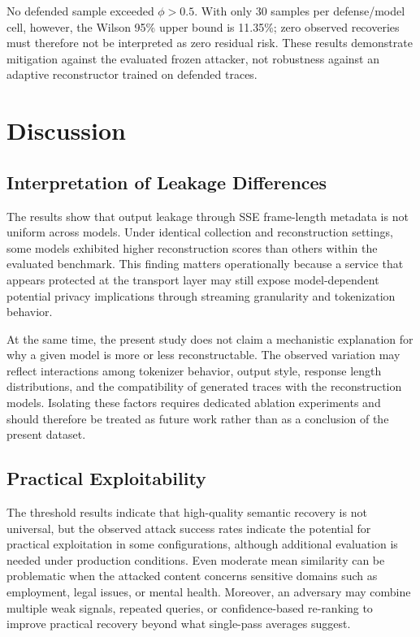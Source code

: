 \documentclass[journal,article,submit,pdftex,moreauthors]{Definitions/mdpi}
\begin{document}
No defended sample exceeded $\phi>0.5$. With only 30 samples per defense/model cell, however, the Wilson 95\% upper bound is 11.35\%; zero observed recoveries must therefore not be interpreted as zero residual risk. These results demonstrate mitigation against the evaluated frozen attacker, not robustness against an adaptive reconstructor trained on defended traces.

\section{Discussion}
\subsection{Interpretation of Leakage Differences}
The results show that output leakage through SSE frame-length metadata is not uniform across models. Under identical collection and reconstruction settings, some models exhibited higher reconstruction scores than others within the evaluated benchmark. This finding matters operationally because a service that appears protected at the transport layer may still expose model-dependent potential privacy implications through streaming granularity and tokenization behavior.

At the same time, the present study does not claim a mechanistic explanation for why a given model is more or less reconstructable. The observed variation may reflect interactions among tokenizer behavior, output style, response length distributions, and the compatibility of generated traces with the reconstruction models. Isolating these factors requires dedicated ablation experiments and should therefore be treated as future work rather than as a conclusion of the present dataset.

\subsection{Practical Exploitability}
The threshold results indicate that high-quality semantic recovery is not universal, but the observed attack success rates indicate the potential for practical exploitation in some configurations, although additional evaluation is needed under production conditions. Even moderate mean similarity can be problematic when the attacked content concerns sensitive domains such as employment, legal issues, or mental health. Moreover, an adversary may combine multiple weak signals, repeated queries, or confidence-based re-ranking to improve practical recovery beyond what single-pass averages suggest.
\end{document}
